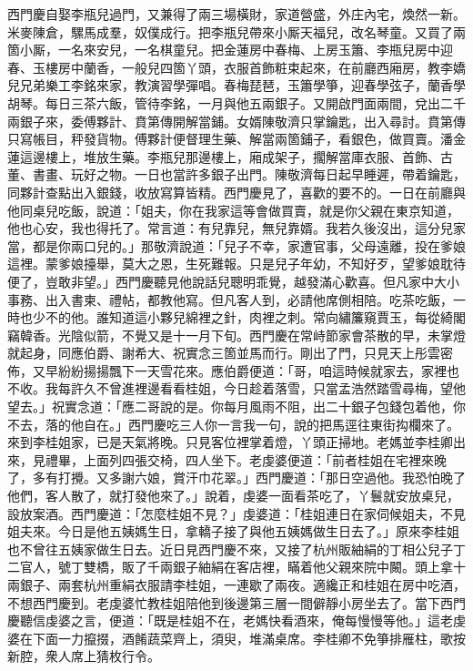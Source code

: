 西門慶自娶李瓶兒過門，又兼得了兩三場橫財，家道營盛，外庄內宅，煥然一新。米麥陳倉，騾馬成羣，奴僕成行。把李瓶兒帶來小厮天福兒，改名琴童。又買了兩箇小厮，一名來安兒，一名棋童兒。把金蓮房中春梅、上房玉簫、李瓶兒房中迎春、玉樓房中蘭香，一般兒四箇丫頭，衣服首飾粧束起來，在前廳西廂房，教李嬌兒兄弟樂工李銘來家，教演習學彈唱。{}春梅琵琶，玉簫學箏，迎春學弦子，蘭香學胡琴。每日三茶六飯，管待李銘，一月與他五兩銀子。又開啟門面兩間，兌出二千兩銀子來，委傅夥計、賁第傳開解當鋪。女婿陳敬濟只掌鑰匙，出入尋討。賁第傳只寫帳目，秤發貨物。傅夥計便督理生藥、解當兩箇鋪子，看銀色，做買賣。潘金蓮這邊樓上，堆放生藥。李瓶兒那邊樓上，廂成架子，擱解當庫衣服、首飾、古董、書畫、玩好之物。一日也當許多銀子出門。陳敬濟每日起早睡遲，帶着鑰匙，同夥計查點出入銀錢，收放寫算皆精。西門慶見了，喜歡的要不的。一日在前廳與他同桌兒吃飯，說道：「姐夫，你在我家這等會做買賣，就是你父親在東京知道，他也心安，我也得托了。常言道：有兒靠兒，無兒靠婿。我若久後沒出，這分兒家當，都是你兩口兒的。」{}那敬濟說道：「兒子不幸，家遭官事，父母遠離，投在爹娘這裡。蒙爹娘擡舉，莫大之恩，生死難報。只是兒子年幼，不知好歹，望爹娘耽待便了，豈敢非望。」西門慶聽見他說話兒聰明乖覺，越發滿心歡喜。但凡家中大小事務、出入書柬、禮帖，都教他寫。但凡客人到，必請他席側相陪。吃茶吃飯，一時也少不的他。誰知道這小夥兒綿裡之針，肉裡之刺。常向繡簾窺賈玉，每從綺閣竊韓香。光陰似箭，不覺又是十一月下旬。西門慶在常峙節家會茶散的早，未掌燈就起身，同應伯爵、謝希大、祝實念三箇並馬而行。剛出了門，只見天上彤雲密佈，又早紛紛揚揚飄下一天雪花來。應伯爵便道：「哥，咱這時候就家去，家裡也不收。我每許久不曾進裡邊看看桂姐，今日趁着落雪，只當孟浩然踏雪尋梅，望他望去。」祝實念道：「應二哥說的是。你每月風雨不阻，出二十銀子包錢包着他，{}你不去，落的他自在。」西門慶吃三人你一言我一句，說的把馬逕往東街抅欄來了。來到李桂姐家，已是天氣將晚。只見客位裡掌着燈，丫頭正掃地。老媽並李桂卿出來，見禮畢，上面列四張交椅，四人坐下。老虔婆便道：「前者桂姐在宅裡來晚了，多有打攪。又多謝六娘，賞汗巾花翠。」西門慶道：「那日空過他。我恐怕晚了他們，客人散了，就打發他來了。」說着，虔婆一面看茶吃了，丫鬟就安放桌兒，設放案酒。西門慶道：「怎麼桂姐不見？」虔婆道：「桂姐連日在家伺候姐夫，不見姐夫來。今日是他五姨媽生日，拿轎子接了與他五姨媽做生日去了。」原來李桂姐也不曾往五姨家做生日去。近日見西門慶不來，又接了杭州販紬絹的丁相公兒子丁二官人，號丁雙橋，販了千兩銀子紬絹在客店裡，瞞着他父親來院中闝。頭上拿十兩銀子、兩套杭州重絹衣服請李桂姐，一連歇了兩夜。適纔正和桂姐在房中吃酒，不想西門慶到。老虔婆忙教桂姐陪他到後邊第三層一間僻靜小房坐去了。當下西門慶聽信虔婆之言，便道：「既是桂姐不在，老媽快看酒來，俺每慢慢等他。」這老虔婆在下面一力攛掇，酒餚蔬菜齊上，須臾，堆滿桌席。李桂卿不免箏排雁柱，歌按新腔，衆人席上猜枚行令。


